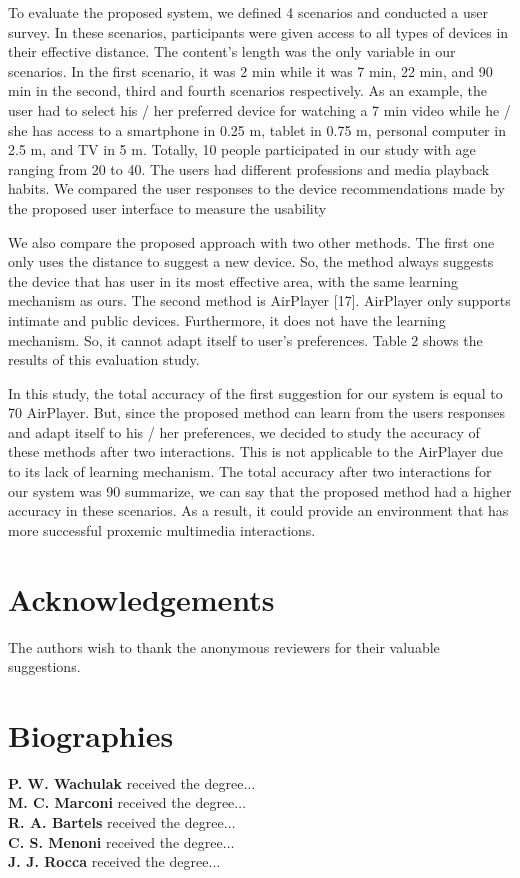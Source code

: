 \documentclass[]{IEEEphot}
\begin{document}
 To evaluate the proposed system, we defined 4 scenarios and conducted a user
survey. In these scenarios, participants were given access to all types of devices
in their effective distance. The content’s length was the only variable in our
scenarios. In the first scenario, it was 2 min while it was 7 min, 22 min, and 90
min in the second, third and fourth scenarios respectively. As an example, the
user had to select his / her preferred device for watching a 7 min video while he
/ she has access to a smartphone in 0.25 m, tablet in 0.75 m, personal computer
in 2.5 m, and TV in 5 m. Totally, 10 people participated in our study with age
ranging from 20 to 40. The users had different professions and media playback
habits. We compared the user responses to the device recommendations made
by the proposed user interface to measure the usability




We also compare the proposed approach with two other methods. The first
one only uses the distance to suggest a new device. So, the method always suggests the device that has user in its most effective area, with the same learning
mechanism as ours. The second method is AirPlayer [17]. AirPlayer only supports intimate and public devices. Furthermore, it does not have the learning
mechanism. So, it cannot adapt itself to user’s preferences. Table 2 shows the
results of this evaluation study.


In this study, the total accuracy of the first suggestion for our system is
equal to 70%
AirPlayer. But, since the proposed method can learn from the users responses
and adapt itself to his / her preferences, we decided to study the accuracy of
these methods after two interactions. This is not applicable to the AirPlayer
due to its lack of learning mechanism. The total accuracy after two interactions
for our system was 90%
summarize, we can say that the proposed method had a higher accuracy in these
scenarios. As a result, it could provide an environment that has more successful
proxemic multimedia interactions.

\section*{Acknowledgements}
The authors wish to thank the anonymous reviewers for their valuable suggestions.  





\section*{Biographies}

\textbf{P. W. Wachulak} received the degree${\ldots}$ \\[6pt]
\textbf{M. C. Marconi} received the degree${\ldots}$ \\[6pt]
\textbf{R. A. Bartels} received the degree${\ldots}$ \\[6pt]
\textbf{C. S. Menoni} received the degree${\ldots}$ \\[6pt]
\textbf{J. J. Rocca} received the degree${\ldots}$
\end{document}
